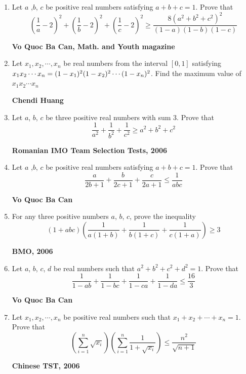 \documentclass{article}
\begin{document}
\begin{enumerate}
\item Let $a$ ,$b$, $c$ be positive real numbers satisfying $a+b+c=1$. Prove that $$\left(\frac{1}{a}-2\right)^2+\left(\frac{1}{b}-2\right)^2+\left(\frac{1}{c}-2\right)^2 \geq \frac{8(a^2+b^2+c^2)^2}{(1-a)(1-b)(1-c)} $$
\begin {flushright}
\textbf{Vo Quoc Ba Can, Math. and Youth magazine}
\end{flushright}
\item Let $x_1,x_2,\cdots ,x_n$ be real numbers from the interval $[0,1]$ satisfying $x_1x_2\cdots x_n =\\ (1-x_1)^2 (1-x_2)^2\cdots (1-x_n)^2$. Find the maximum value of $x_1x_2\cdots x_n$
\begin {flushright}
\textbf{Chendi Huang}
\end{flushright}
\item Let $a$, $b$, $c$ be three positive real numbers with sum 3. Prove that $$\frac{1}{a^2}+\frac{1}{b^2}+\frac{1}{c^2}\geq a^2+b^2+c^2$$
\begin {flushright}
\textbf{Romanian IMO Team Selection Tests, 2006}
\end{flushright}
\item Let $a$ ,$b$, $c$ be positive real numbers satisfying $a+b+c=1$. Prove that $$\frac{a}{2b+1}+\frac{b}{2c+1}+\frac{c}{2a+1}\leq \frac{1}{abc}$$
\begin{flushright}
\textbf{Vo Quoc Ba Can}
\end{flushright}
\item For any three positive numbers $a$, $b$, $c$, prove the inequality $$(1+abc)\left(\frac{1}{a(1+b)}+\frac{1}{b(1+c)}+\frac{1}{c(1+a)}\right)\geq 3$$
\begin{flushright}
\textbf{BMO, 2006}
\end{flushright}
\item Let $a$, $b$, $c$, $d$ be real numbers such that $a^2+b^2+c^2+d^2=1$. Prove that $$\frac{1}{1-ab}+\frac{1}{1-bc}+\frac{1}{1-ca}+\frac{1}{1-da}\leq \frac{16}{3}$$
\begin{flushright}
\textbf{Vo Quoc Ba Can}
\end{flushright}
\item  Let $x_1,x_2,\cdots ,x_n$ be positive real numbers such that $x_1+x_2+\cdots +x_n=1$. Prove that $$\left(\sum \limits_{i=1}^n\sqrt{x_i}\right)\left(\sum \limits_{i=1}^n \frac{1}{1+\sqrt{x_i}}\right)\leq \frac{n^2}{\sqrt{n+1}}$$
\begin{flushright}
\textbf{Chinese TST, 2006}
\end{flushright}

\end{enumerate}
\end{document}

